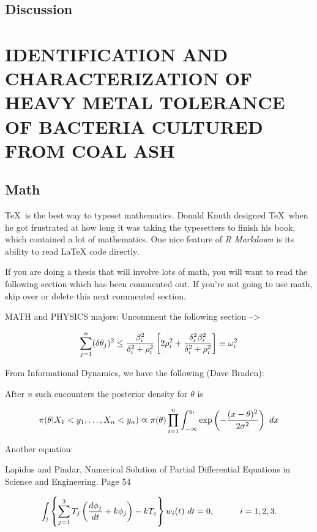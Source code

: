 \documentclass[ms]{uncgdissertationexp}
\theoremstyle{plain}
\theoremstyle{definition}
\theoremstyle{remark}
\begin{document}
  \section{Discussion}\label{discussion}
  
  \chapter{IDENTIFICATION AND CHARACTERIZATION OF HEAVY METAL TOLERANCE OF
  BACTERIA CULTURED FROM COAL ASH}\label{math-sci}
  
  \section*{Math}\label{Math}
  
  \TeX~is the best way to typeset mathematics. Donald Knuth designed
  \TeX~when he got frustrated at how long it was taking the typesetters to
  finish his book, which contained a lot of mathematics. One nice feature
  of \emph{R Markdown} is its ability to read LaTeX code directly.
  
  If you are doing a thesis that will involve lots of math, you will want
  to read the following section which has been commented out. If you're
  not going to use math, skip over or delete this next commented section.
  
  MATH and PHYSICS majors: Uncomment the following section
  --\textgreater{}
  
  \[\sum_{j=1}^n (\delta\theta_j)^2 \leq {{\beta_i^2}\over{\delta_i^2 + \rho_i^2}}
  \left[ 2\rho_i^2 + {\delta_i^2\beta_i^2\over{\delta_i^2 + \rho_i^2}} \right] \equiv \omega_i^2
  \]
  
  From Informational Dynamics, we have the following (Dave Braden):
  
  After \emph{n} such encounters the posterior density for \(\theta\) is
  
  \[
  \pi(\theta\vert X_1< y_1,\dots,X_n<y_n) \varpropto \pi(\theta) \prod_{i=1}^n\int_{-\infty}^{y_i}
     \exp\left(-{(x-\theta)^2\over{2\sigma^2}}\right)\ dx
  \]
  
  Another equation:
  
  Lapidus and Pindar, Numerical Solution of Partial Differential Equations
  in Science and Engineering. Page 54
  
  \[
  \int_t\left\{\sum_{j=1}^3 T_j \left({d\phi_j\over dt}+k\phi_j\right)-kT_e\right\}w_i(t)\ dt=0,
     \qquad\quad i=1,2,3.
  \]
  
\end{document}

